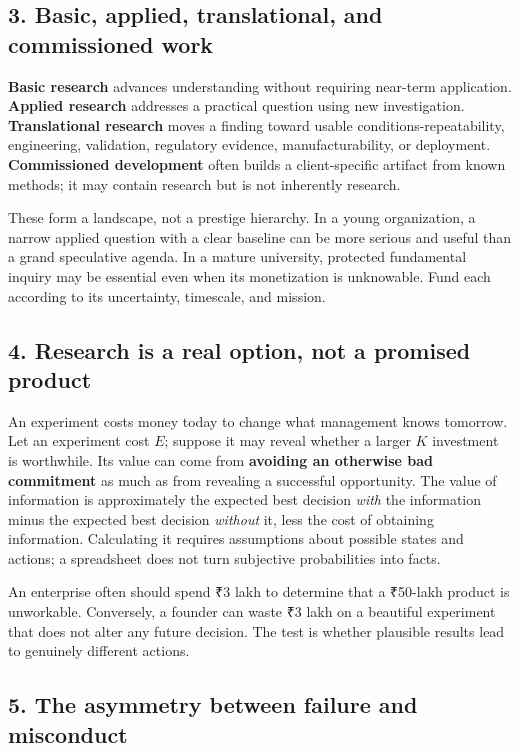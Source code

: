 \subsection{3. Basic, applied, translational, and commissioned work}

\textbf{Basic research} advances understanding without requiring near-term application. \textbf{Applied research} addresses a practical question using new investigation. \textbf{Translational research} moves a finding toward usable conditions-repeatability, engineering, validation, regulatory evidence, manufacturability, or deployment. \textbf{Commissioned development} often builds a client-specific artifact from known methods; it may contain research but is not inherently research.

These form a landscape, not a prestige hierarchy. In a young organization, a narrow applied question with a clear baseline can be more serious and useful than a grand speculative agenda. In a mature university, protected fundamental inquiry may be essential even when its monetization is unknowable. Fund each according to its uncertainty, timescale, and mission.

\subsection{4. Research is a real option, not a promised product}

An experiment costs money today to change what management knows tomorrow. Let an experiment cost $E$; suppose it may reveal whether a larger $K$ investment is worthwhile. Its value can come from \textbf{avoiding an otherwise bad commitment} as much as from revealing a successful opportunity. The value of information is approximately the expected best decision \textit{with} the information minus the expected best decision \textit{without} it, less the cost of obtaining information. Calculating it requires assumptions about possible states and actions; a spreadsheet does not turn subjective probabilities into facts.

An enterprise often should spend ₹3 lakh to determine that a ₹50-lakh product is unworkable. Conversely, a founder can waste ₹3 lakh on a beautiful experiment that does not alter any future decision. The test is whether plausible results lead to genuinely different actions.

\subsection{5. The asymmetry between failure and misconduct}

